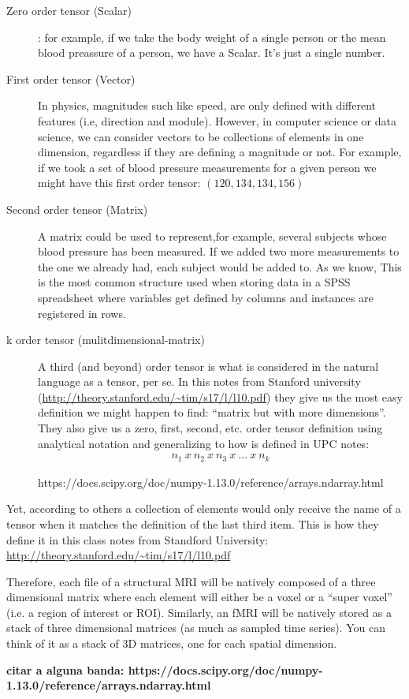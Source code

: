 		\begin{description}
			\item[Zero order tensor (Scalar)]: for example, if we take the body weight of a single person or the mean blood preassure of a person, we have a Scalar. It's just a single number.
			\item[First order tensor (Vector)] In physics, magnitudes such like speed, are only defined with different features (i.e, direction and module). However, in computer science or data science, we can consider vectors to be collections of elements in one dimension, regardless if they are defining a magnitude or not. For example, if we took a set of blood pressure measurements for a given person we might have this first order tensor: $ (120,134,134,156) $
			
			
			\item[Second order tensor (Matrix)] A matrix could be used to represent,for example, several subjects whose blood pressure has been measured. If we added two more measurements to the one we already had, each subject would be added to. As we know, This is the most common structure used when storing data in a SPSS spreadsheet where variables get defined by columns and instances are registered in rows.
			
			 
			\item[k order tensor (mulitdimensional-matrix)] A third (and beyond) order tensor is what is considered in the natural language as a tensor, per se. In this notes from Stanford university (\url{http://theory.stanford.edu/~tim/s17/l/l10.pdf}) they give us the most easy definition we might happen to find: ``matrix but with more dimensions''. They also give us a zero, first, second, etc. order tensor definition using analytical notation and generalizing to how is defined in  UPC notes:
			\begin{align*}
				 n_{1} \ x \ n_{2} \ x \ n_{3} \ x \ ... \ x \ n_{k}
			\end{align*}	

			
			
			https://docs.scipy.org/doc/numpy-1.13.0/reference/arrays.ndarray.html
			
			
				
		\end{description}
		Yet, according to others a collection of elements would only receive the name of a tensor when it matches the definition of the last third item. This is how they define it in this class notes from Standford University: \url{http://theory.stanford.edu/~tim/s17/l/l10.pdf}
		
		Therefore, each file of a structural MRI will be natively composed of a three dimensional matrix where each element will either be a voxel or a ``super voxel'' (i.e. a region of interest or ROI). Similarly, an fMRI will be natively stored as a stack of three dimensional matrices (as much as sampled time series). You can think of it as a stack of 3D matrices, one for each spatial dimension.

		
		\textbf{citar a alguna banda: https://docs.scipy.org/doc/numpy-1.13.0/reference/arrays.ndarray.html}